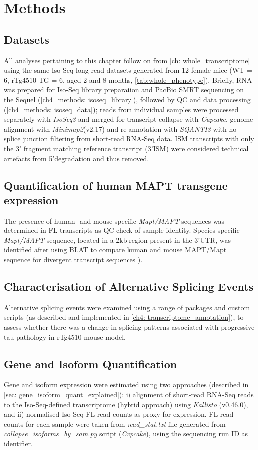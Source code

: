 \newpage
\section{Methods}

\subsection{Datasets}
All analyses pertaining to this chapter follow on from \cref{ch: whole_transcriptome} using the same Iso-Seq long-read datasets generated from 12 female mice (WT = 6, rTg4510 TG = 6, aged 2 and 8 months, \cref{tab:whole_phenotype}). Briefly, RNA was prepared for Iso-Seq library preparation and PacBio SMRT sequencing on the Sequel (\cref{ch4_methods: isoseq_library}), followed by QC and data processing (\cref{ch4_methods: isoseq_data}); reads from individual samples were processed separately with \textit{IsoSeq3} and merged for transcript collapse with \textit{Cupcake}, genome alignment with \textit{Minimap2}(v2.17) and re-annotation with \textit{SQANTI3} with no splice junction filtering from short-read RNA-Seq data. ISM transcripts with only the 3' fragment matching reference transcript (3'ISM) were considered technical artefacts from 5'degradation and thus removed.  

\subsection{Quantification of human MAPT transgene expression} 
The presence of human- and mouse-specific \textit{Mapt/MAPT} sequences was determined in FL transcripts as QC check of sample identity. Species-specific \textit{Mapt/MAPT} sequence, located in a 2kb region present in the 3'UTR, was identified after using BLAT\cite{Kent2002} to compare human and mouse MAPT/Mapt sequence for divergent transcript sequences \cite{Castanho2020}).  

\subsection{Characterisation of Alternative Splicing Events} 
Alternative splicing events were examined using a range of packages and custom scripts (as described and implemented in \cref{ch4: transcriptome_annotation}), to assess whether there was a change in splicing patterns associated with progressive tau pathology in rTg4510 mouse model. 

\subsection{Gene and Isoform Quantification}
Gene and isoform expression were estimated using two approaches (described in \cref{sec: gene_isoform_quant_explained}): i) alignment of short-read RNA-Seq reads to the Iso-Seq-defined transcriptome (hybrid approach) using \textit{Kallisto}\cite{Bray2016} (v0.46.0), and ii) normalised Iso-Seq FL read counts as proxy for expression. FL read counts for each sample were taken from \textit{read\_stat.txt} file generated from \textit{collapse\_isoforms\_by\_sam.py} script (\textit{Cupcake}), using the sequencing run ID as identifier. 

